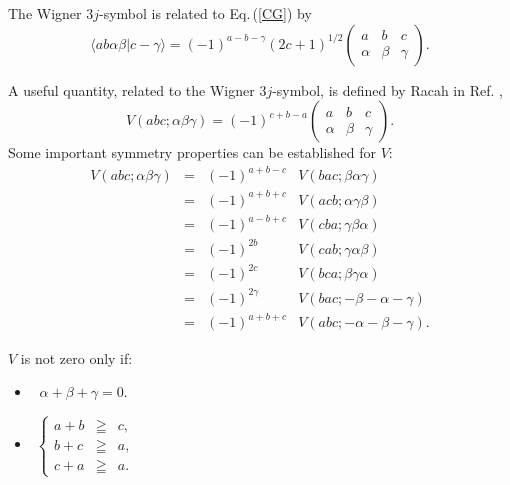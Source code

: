 \documentclass[]{interact}
\def\refe#1{{\color{blue}\textsf{Eq.}\,(\ref{#1})}}
\begin{document}
The Wigner $3j$-symbol is related to \refe{CG} by
\begin{equation}
 \langle ab\alpha\beta|c-\gamma\rangle = (-1)^{a-b-\gamma}(2c+1)^{1/2}\left(\begin{array}{ccc} a&b&c \\ \alpha&\beta&\gamma \end{array}\right).
\end{equation}

A useful quantity, related to the Wigner $3j$-symbol, is  defined by Racah in Ref. \cite{Racah},
\begin{equation}
\label{V}
 V(abc;\alpha\beta\gamma) = (-1)^{c+b-a}\left(\begin{array}{ccc} a&b&c \\ \alpha&\beta&\gamma \end{array}\right).
\end{equation}
Some important symmetry properties can be established for $V$: 
\begin{equation}
\label{symmetry}
 \begin{array}{rcll}
  V(abc;\alpha\beta\gamma)&=&(-1)^{a+b-c}&V(bac;\beta\alpha\gamma)\\
                          &=&(-1)^{a+b+c}&V(acb;\alpha\gamma\beta)\\
                          &=&(-1)^{a-b+c}&V(cba;\gamma\beta\alpha)\\
                          &=&(-1)^{2b}   &V(cab;\gamma\alpha\beta)\\
                          &=&(-1)^{2c}   &V(bca;\beta\gamma\alpha)\\
                          &=&(-1)^{2\gamma}&V(bac;-\beta-\alpha-\gamma)\\
                          &=&(-1)^{a+b+c}  &V(abc;-\alpha-\beta-\gamma).
 \end{array}
\end{equation}

$V$ is not zero only if:
\begin{itemize}
 \item $\;\;\alpha+\beta+\gamma=0$.\\
 
 
 \item $\;\left\{\begin{array}{ccc}a+b&\geqq& c, \\ 
                                   b+c&\geqq& a, \\
                                   c+a&\geqq& a.\end{array}\right.$
\end{itemize}
\end{document}
